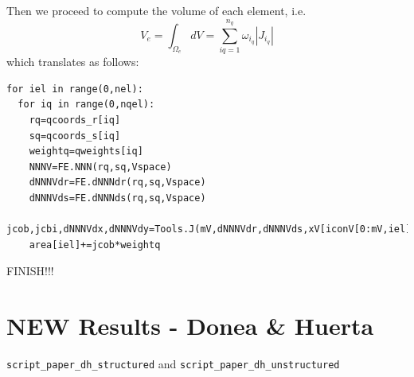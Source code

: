 Then we proceed to compute the volume of each element, i.e. 
\[
V_e = \int_{\Omega_e} dV = \sum_{iq=1}^{n_q} \omega_{i_q} |J_{i_q}|
\]
which translates as follows: 
\begin{lstlisting}
for iel in range(0,nel):
  for iq in range(0,nqel):
    rq=qcoords_r[iq]
    sq=qcoords_s[iq]
    weightq=qweights[iq]
    NNNV=FE.NNN(rq,sq,Vspace)
    dNNNVdr=FE.dNNNdr(rq,sq,Vspace)
    dNNNVds=FE.dNNNds(rq,sq,Vspace)
    jcob,jcbi,dNNNVdx,dNNNVdy=Tools.J(mV,dNNNVdr,dNNNVds,xV[iconV[0:mV,iel]],yV[iconV[0:mV,iel]])
    area[iel]+=jcob*weightq
\end{lstlisting}

FINISH!!!

\newpage
\section*{NEW Results - Donea \& Huerta}

{\tt script\_paper\_dh\_structured} and {\tt script\_paper\_dh\_unstructured}

